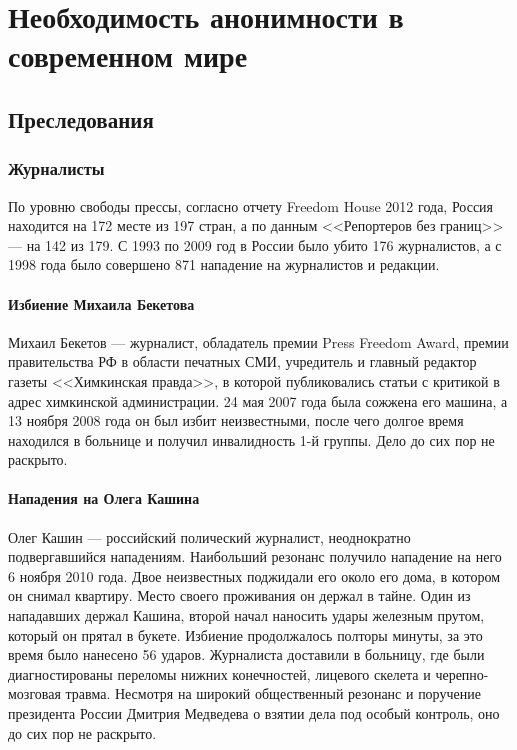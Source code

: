 \part{Необходимость анонимности в современном мире}
\chapter{Преследования}
\section{Журналисты}
По уровню свободы прессы, согласно отчету Freedom House 2012 года, Россия находится на 172 месте из 197 стран\cite{pressfreedom}, а по данным <<Репортеров без границ>> --- на 142 из 179\cite{rsf}. С 1993 по 2009 год в России было убито 176 журналистов\cite{kill}, а с 1998 года было совершено 871 нападение на журналистов и редакции\cite{attack}.
\subsection{Избиение Михаила Бекетова}
Михаил Бекетов --- журналист, обладатель премии Press Freedom Award\cite{beketov_award}, премии правительства РФ в области печатных СМИ\cite{beketov_gosaward}, учредитель и главный редактор газеты <<Химкинская правда>>, в которой публиковались статьи с критикой в адрес химкинской администрации. 24 мая 2007 года была сожжена его машина\cite{beketov_car}, а 13 ноября 2008 года он был избит неизвестными\cite{beketov_beat}, после чего долгое время находился в больнице и получил инвалидность 1-й группы\cite{beketov_invalid}. Дело до сих пор не раскрыто.
\subsection{Нападения на Олега Кашина}
Олег Кашин --- российский полический журналист, неоднократно подвергавшийся нападениям. Наибольший резонанс получило нападение на него 6 ноября 2010 года. Двое неизвестных поджидали его около его дома, в котором он снимал квартиру. Место своего проживания он держал в тайне. Один из нападавших держал Кашина, второй начал наносить удары железным прутом, который он прятал в букете\cite{kashin_beat}. Избиение продолжалось полторы минуты, за это время было нанесено 56 ударов\cite{kashin_count}. Журналиста доставили в больницу, где были диагностированы переломы нижних конечностей, лицевого скелета и черепно-мозговая травма\cite{kashin_trauma}. Несмотря на широкий общественный резонанс и поручение президента России Дмитрия Медведева о взятии дела под особый контроль\cite{kashin_medvedev}, оно до сих пор не раскрыто.
